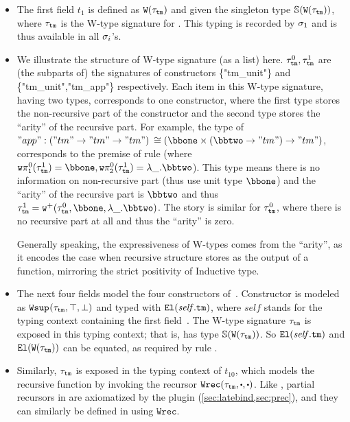 \begin{itemize}
  [labelsep=*,leftmargin=1pc,itemsep=3pt]

\item 
The first field $t_1$ is defined as $\texttt{W}({\tau_{\texttt{tm}}})$
and given the singleton type $\mathbb{S}({\texttt{W}({\tau_{\texttt{tm}}})})$, where $\tau_{\texttt{tm}}$
is the W-type signature for .
This typing is recorded by $\sigma_1$ and is thus available in all $\sigma_i$'s.

\item We illustrate the structure of W-type signature (as a list) here. $\tau_{\texttt{tm}}^0, \tau_{\texttt{tm}}^1$ are (the subparts of) the signatures of constructors \{"tm\_unit"\} and \{"tm\_unit","tm\_app"\} respectively. Each item in this W-type signature, having two types, corresponds to one constructor, where the first type stores the non-recursive part of the constructor and the second type stores the ``arity'' of the  recursive part. For example, the type of $"app" : ("tm" \to "tm" \to "tm")$ $\cong (\bbone \times (\bbtwo \to "tm") \to "tm")$, corresponds to the premise of rule  (where $\wsigproj{0}{1}{\wsig_{\texttt{tm}}^1} = \bbone, \wsigproj{0}{2}{\wsig_{\texttt{tm}}^1} = \lambda \_ . \bbtwo$). This type means there is no information on non-recursive part (thus use unit type $\bbone$) and the ``arity'' of the recursive part is $\bbtwo$ and thus $\wsig_{\texttt{tm}}^1 = \WSigAdd{\wsig_{\texttt{tm}}^0}{\bbone}{\lambda \_ .\bbtwo}$.  The story is similar for $\tau_{\texttt{tm}}^0$, where there is no recursive part at all and thus the ``arity'' is zero.

Generally speaking, the expressiveness of W-types comes from the ``arity'', as it encodes the case when recursive structure stores as the output of a function, mirroring the strict positivity of Inductive type.
\item 
The next four fields model the four constructors of~.
Constructor  is modeled as $\texttt{Wsup}_{}({\tau_{\texttt{tm}}},{\top},{\bot})$
and typed with $\texttt{El}({\mathit{self}.\texttt{tm}})$, where $\mathit{self}$ stands for
the typing context containing the first field~.
The W-type signature $\tau_{\texttt{tm}}$ is exposed in
this typing context; that is,  has type $\mathbb{S}({\texttt{W}({\tau_{\texttt{tm}}})})$.
So $\texttt{El}({\mathit{self}.\texttt{tm}})$ and $\texttt{El}({\texttt{W}({\tau_{\texttt{tm}}})})$ can be equated,
as required by rule .

\item
Similarly, $\tau_{\texttt{tm}}$ is exposed in the typing context of
$t_{10}$, which models the recursive function  by invoking
the recursor $\Wrec{\wsig_{\texttt{tm}}}{\cDot}{\cDot}$.
%
Like , partial recursors in \Lang are axiomatized by the plugin
(\cref{sec:latebind,sec:prec}), and they can similarly be defined in \TT
using $\texttt{Wrec}$.


\end{itemize}
